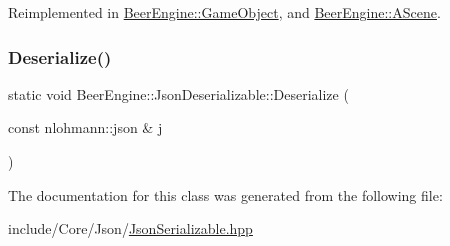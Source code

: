 Reimplemented in \mbox{\hyperlink{class_beer_engine_1_1_game_object_a68a7f2c23d06d575e683705195821c87}{Beer\+Engine\+::\+Game\+Object}}, and \mbox{\hyperlink{class_beer_engine_1_1_a_scene_a3db491adb7ff57a3a527024fd0a6001f}{Beer\+Engine\+::\+A\+Scene}}.

\mbox{\label{class_beer_engine_1_1_json_deserializable_af4c5582f75eb96988c5d4ff546218e1e}} 
\subsubsection{\texorpdfstring{Deserialize()}{Deserialize()}}
{\footnotesize\ttfamily static void Beer\+Engine\+::\+Json\+Deserializable\+::\+Deserialize (\begin{DoxyParamCaption}\item[{const nlohmann\+::json \&}]{j }\end{DoxyParamCaption})\hspace{0.3cm}{\ttfamily [static]}}



The documentation for this class was generated from the following file\+:\begin{DoxyCompactItemize}
\item 
include/\+Core/\+Json/\mbox{\hyperlink{_json_serializable_8hpp}{Json\+Serializable.\+hpp}}\end{DoxyCompactItemize}
